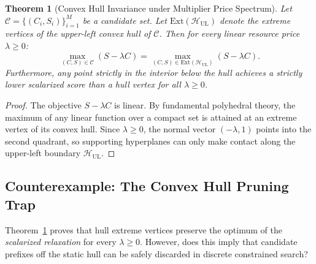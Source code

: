 \documentclass[11pt,a4paper]{article}
\theoremstyle{plain}
\newtheorem{theorem}{Theorem}
\theoremstyle{definition}
\theoremstyle{remark}
\begin{document}
\begin{theorem}[Convex Hull Invariance under Multiplier Price Spectrum]
\label{thm:hull_invariance}
Let $\mathcal{C} = \{(C_i, S_i)\}_{i=1}^M$ be a candidate set. Let $\text{Ext}(\mathcal{H}_{\text{UL}})$ denote the extreme vertices of the upper-left convex hull of $\mathcal{C}$. Then for every linear resource price $\lambda \ge 0$:
\begin{equation}
\max_{(C, S) \in \mathcal{C}} (S - \lambda C) = \max_{(C, S) \in \text{Ext}(\mathcal{H}_{\text{UL}})} (S - \lambda C).
\end{equation}
Furthermore, any point strictly in the interior below the hull achieves a strictly lower scalarized score than a hull vertex for all $\lambda \ge 0$.
\end{theorem}
\begin{proof}
The objective $S - \lambda C$ is linear. By fundamental polyhedral theory, the maximum of any linear function over a compact set is attained at an extreme vertex of its convex hull. Since $\lambda \ge 0$, the normal vector $(-\lambda, 1)$ points into the second quadrant, so supporting hyperplanes can only make contact along the upper-left boundary $\mathcal{H}_{\text{UL}}$.
\end{proof}

\subsection{Counterexample: The Convex Hull Pruning Trap}
\label{sec:hull_trap}
Theorem~\ref{thm:hull_invariance} proves that hull extreme vertices preserve the optimum of the \emph{scalarized relaxation} for every $\lambda \ge 0$. However, does this imply that candidate prefixes off the static hull can be safely discarded in discrete constrained search? 
\end{document}
